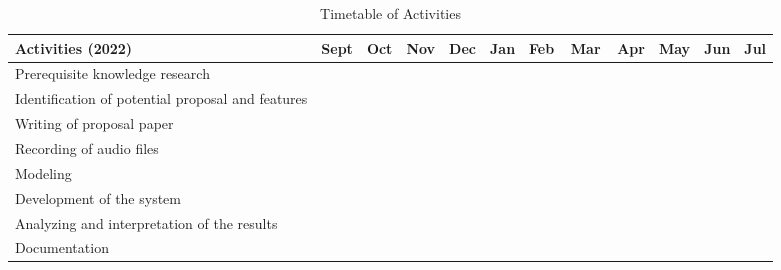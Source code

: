 \begin{table}[!]   %
	\setlength{\extrarowheight}{2pt}
	\setlength{\tabcolsep}{0.2em}
	\centering
	\caption{Timetable of Activities} \vspace{0.25em}
	\begin{tabular}{|p{2in}|c|c|c|c|c|c|c|c|c|c|c|} \hline
		\centering Activities (2022) & Sept & Oct & Nov & Dec & Jan & Feb & Mar & Apr & May & Jun & Jul\\ \hline
		Prerequisite knowledge research & ~~~\weektwo & ~~~\weektwo & & & & & & & & &\\ \hline
		Identification of potential proposal and features &  & \weektwo & \weekthree & & & & & & & &\\ \hline
		Writing of proposal paper     &   &  & \weekone & \weekfour & & & & & & &\\ \hline
		Recording of audio files    & & &  & & & \weektwo~~~ &  & & & &\\ \hline
		Modeling     &   &  &  & & & \weekone & \weekthree & \weekone & & &\\ \hline
		Development of the system &   &  &  &  &  &  & \weekone~~~~~ & \weekthree & \weektwo & \weekone &\\ \hline
		Analyzing and interpretation of the results & & & & & & & & & \weekthree & \weekone &\\ \hline
		Documentation & ~~~\weektwo  & \weekfour & \weekfour & \weekfour &  & \weekthree & \weekfour & \weekthree & \weekfour & \weekone & \weekone \\ \hline
	\end{tabular}
	\label{tab:timetableactivities}
\end{table}

